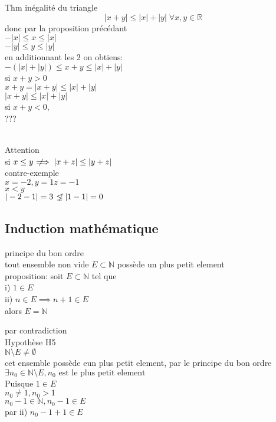 \documentclass{article}
\newcommand{\notimplies}{\;\not\!\!\!\implies}
\newcommand{\notle}{\;\not\!\le}
\newcommand{\reals}{\mathbb{R}}
\newcommand{\naturals}{\mathbb{N}}
\begin{document}
Thm inégalité du triangle \\
$$|x + y| \le |x| +|y| \; \forall x, y \in \reals$$
donc par la proposition précédant \\
$-|x| \le x \le |x|$\\
$-|y| \le y \le |y|$\\
en additionnant les 2 on obtiens: \\
$-(|x| + |y|) \le x + y \le |x| + |y|$ \\

si $x + y > 0$ \\
$x + y = |x+y| \le |x| + |y|$\\
$|x + y| \le |x| + |y|$ \\

si $x + y < 0,$\\
??? \\\

Attention\\
si $x \le y \notimplies |x + z| \le |y + z| $ \\
contre-exemple \\
$ x = -2, y = 1 z = -1 $ \\
$ x < y $ \\
$ | - 2 - 1 | = 3  \notle | 1 - 1 | = 0$ 

\subsection{Induction mathématique}

principe du bon ordre\\
tout ensemble non vide $ E \subset \naturals$ possède un plus petit element\\

proposition: soit $E \subset \naturals$ tel que \\
i) $1 \in E$\\
ii) $n \in E \implies n+1 \in E$\\

alors $E  = \naturals$

par contradiction\\
Hypothèse H5\\
$\naturals \setminus E \ne \emptyset$\\
cet ensemble possède eun plus petit element, par le principe du bon ordre\\
$\exists n_0 \in \naturals \setminus E, n_0 \text{ est le plus petit element}$ \\

Puisque $1 \in E$\\
$n_0 \ne 1, n_0 > 1$\\
$n_0 - 1 \in \naturals, n_0 - 1 \in E$ \\
par ii) $n_0 -1 + 1 \in E$\\
\end{document}
